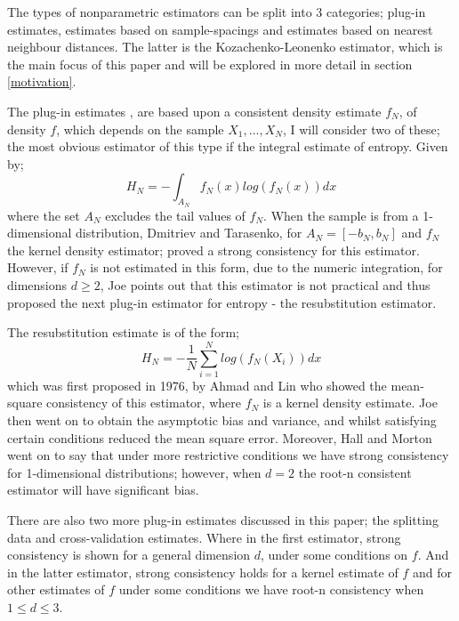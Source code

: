 \documentclass{report}
\begin{document}
The types of nonparametric estimators can be split into 3 categories; plug-in estimates, estimates based on sample-spacings and estimates based on nearest neighbour distances. The latter is the Kozachenko-Leonenko estimator, which is the main focus of this paper and will be explored in more detail in section \ref{motivation}.

The plug-in estimates \cite{paper10}, \cite{paper7} are based upon a consistent density estimate $f_{N}$, of density $f$, which depends on the sample $X_{1}, ..., X_{N}$, I will consider two of these; the most obvious estimator of this type if the integral estimate of entropy. Given by;
\begin{equation}
H_{N} = - \int_{A_{N}} f_{N}(x) log ( f_{N}(x) )dx
\end{equation}
where the set $A_{N}$ excludes the tail values of $f_{N}$. When the sample is from a 1-dimensional distribution, Dmitriev and Tarasenko, \cite{intest1} for $A_{N} = [-b_{N}, b_{N}]$ and $f_{N}$ the kernel density estimator; proved a strong consistency for this estimator. However, if $f_{N}$ is not estimated in this form, due to the numeric integration, for dimensions $d \geq 2$, Joe \cite{intest2} points out that this estimator is not practical and thus proposed the next plug-in estimator for entropy - the resubstitution estimator.

The resubstitution estimate is of the form;
\begin{equation}
H_{N} = - \frac{1}{N}\sum_{i=1}^{N}  log ( f_{N}(X_{i}) )dx
\end{equation}
which was first proposed in 1976, by Ahmad and Lin \cite{resest1} who showed the mean-square consistency of this estimator, where  $f_{N}$ is a kernel density estimate. Joe \cite{intest2} then went on to obtain the asymptotic bias and variance, and whilst satisfying certain conditions reduced the mean square error. Moreover, Hall and Morton \cite{resest2} went on to say that under more restrictive conditions we have strong consistency for 1-dimensional distributions; however, when $d=2$ the root-n consistent estimator will have significant bias.

There are also two more plug-in estimates discussed in this paper; the splitting data and cross-validation estimates. Where in the first estimator, strong consistency is shown for a general dimension $d$, under some conditions on $f$. And in the latter estimator, strong consistency holds for a kernel estimate of $f$ and for other estimates of $f$ under some conditions we have root-n consistency when $1 \leq d \leq 3$.
\end{document}
